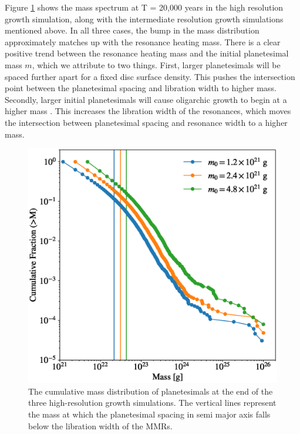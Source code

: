 Figure \ref{fig:resolution_mass_dist} shows the mass spectrum at T = 20,000 years in the high resolution growth simulation, 
along with the intermediate resolution growth simulations mentioned above. In all three cases, the bump in the mass distribution 
approximately matches up with the resonance heating mass. There is a clear positive trend between the resonance heating 
mass and the initial planetesimal mass $m$, which we attribute to two things. First, larger planetesimals will be spaced further 
apart for a fixed disc surface density. This pushes the intersection point between the planetesimal spacing and libration width to 
higher mass. Secondly, larger initial planetesimals will cause oligarchic growth to begin at a higher mass \cite{morishima17}. 
This increases the libration width of the resonances, which moves the intersection between planetesimal spacing and resonance 
width to a higher mass.

\begin{figure}
    \begin{centering}
    \includegraphics[width=0.5\columnwidth]{figures/plSS/cum_model_comparison.eps}
    \caption{The cumulative mass distribution of planetesimals at the end of the three high-resolution growth simulations. The 
    vertical lines represent the mass at which the planetesimal spacing in semi major axis falls below the libration width of the 
    MMRs.}
    \label{fig:resolution_mass_dist}
    \end{centering}
\end{figure}


